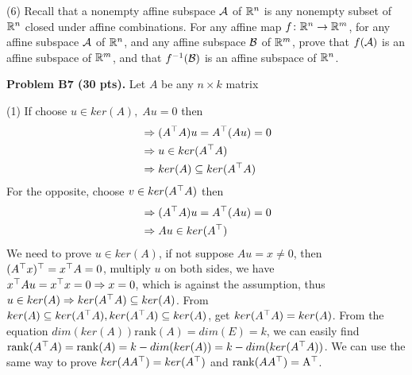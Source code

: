 \documentclass[12pt]{article}
\begin{document}
\medskip
(6)
Recall that a nonempty affine subspace ${\cal A}$ of $\mathbb{R}^n$ is 
any nonempty subset of  $\mathbb{R}^n$ closed under affine combinations.
For any affine map $f\colon \mathbb{R}^n\rightarrow \mathbb{R}^m$, for any
affine subspace ${\cal A}$ of $\mathbb{R}^n$, and any affine subspace ${\cal B}$ of
$\mathbb{R}^m$, prove that $f({\cal A})$ is an affine subspace of $\mathbb{R}^m$, and that
$f^{-1}({\cal B})$ is an affine subspace of $\mathbb{R}^n$.



\vspace {0.25cm}\noindent
{\bf Problem B7 (30 pts).} 
Let $A$ be any $n\times k$ matrix

\medskip
(1) If choose $u \in ker(A), \;  Au = 0$ then
 \begin{align*}
 &\Rightarrow (A^{\top} A) u =  A^{\top} (A u) = 0 \\
 &\Rightarrow u  \in ker(A^{\top} A) \\
 &\Rightarrow ker(A) \subseteq ker(A^{\top} A)
 \end{align*}
 For the opposite, choose $v \in ker(A^{\top} A)$ then 
 \begin{align*}
 &\Rightarrow (A^{\top} A) u = A^{\top} (A u) = 0 \\
 &\Rightarrow A u \in ker(A^{\top}) 
 \end{align*}
 We need to prove $u \in ker(A)$, if not suppose $A u = x \neq 0$, then $( A^{\top} x) ^{\top} = x^{\top} A = 0$, multiply $u$ on both sides, we have $x^{\top} A u = x^{\top} x = 0 \Rightarrow x = 0$, which is against the assumption, thus $u \in ker(A) \Rightarrow ker(A^{\top} A) \subseteq ker(A)$. From $ker(A) \subseteq ker(A^{\top} A), ker(A^{\top} A) \subseteq ker(A)$, get $ker(A^{\top} A) = ker(A)$.
 From the equation $ dim(ker(A))  \mathrm{rank}(A) = dim(E) = k$, we can easily find $\mathrm{rank} (A^{\top} A) = \mathrm{rank}(A) = k - dim(ker(A)) = k - dim(ker(A^{\top}A))$. We can use the same way to prove $ker(AA^{\top}) = ker(A^{\top})$ and $\mathrm{rank}(AA^{\top}) = \mathrm{A^{\top}}$. 
\end{document}
